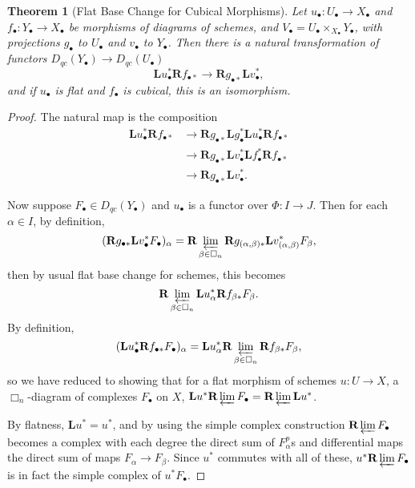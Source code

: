 \documentclass[proquest]{uwthesis}[2014/11/13]
\newtheorem{theorem}{Theorem}[section]
\theoremstyle{definition}
\newcommand{\bL}{\textbf{L}}
\newcommand{\bR}{\textbf{R}}
\begin{document}
\begin{theorem}[Flat Base Change for Cubical Morphisms]
	\label{thm:flatbasechange}
	Let $u_\bullet : U_\bullet \rightarrow X_\bullet$ and $f_\bullet : Y_\bullet \rightarrow X_\bullet$ be morphisms of diagrams of schemes, and $V_\bullet = U_\bullet \times_{X_\bullet} Y_\bullet$, with projections $g_\bullet$ to $U_\bullet$ and $v_\bullet$ to $Y_\bullet$.
	Then there is a natural transformation of functors $D_{qc}(Y_\bullet) \rightarrow D_{qc}(U_\bullet)$
	\[
		\bL u_\bullet^* \bR f_{\bullet *} \rightarrow \bR g_{\bullet *} \bL v_\bullet^*,
	\]
	and if $u_\bullet$ is flat and $f_\bullet$ is cubical, this is an isomorphism.
\end{theorem}
\begin{proof}
	The natural map is the composition
	\begin{align*}
		\bL u_\bullet^* \bR f_{\bullet *} &\rightarrow \bR g_{\bullet *} \bL g_\bullet^* \bL u_\bullet^* \bR f_{\bullet *} \\
		&\rightarrow \bR g_{\bullet *} \bL v_\bullet^* \bL f_\bullet^* \bR f_{\bullet *} \\
		&\rightarrow \bR g_{\bullet *} \bL v_\bullet^*.
	\end{align*}
	
	Now suppose $F_\bullet \in D_{qc}(Y_\bullet)$ and $u_\bullet$ is a functor over $\Phi : I \rightarrow J$.
	Then for each $\alpha \in I$, by definition,
	\[
		(\bR g_{\bullet *} \bL v_\bullet^* F_\bullet)_\alpha = \bR \varprojlim_{\beta \in \Box_n} \bR g_{(\alpha, \beta) *} \bL v_{(\alpha, \beta)}^* F_\beta,
	\]
	then by usual flat base change for schemes, this becomes
	\[
		 \bR \varprojlim_{\beta \in \Box_n} \bL u_{\alpha}^*  \bR f_{\beta *} F_\beta.
	\]
	By definition,
	\[
		(\bL u_\bullet^* \bR f_{\bullet *} F_\bullet)_\alpha = \bL u_\alpha^* \bR \varprojlim_{\beta \in \Box_n} \bR f_{\beta *} F_\beta,
	\]
	so we have reduced to showing that for a flat morphism of schemes $u : U \rightarrow X$, a $\Box_n$-diagram of complexes $F_\bullet$ on $X$, $\bL u^* \bR \varprojlim F_\bullet = \bR \varprojlim \bL u^*$.
	
	By flatness, $\bL u^* = u^*$, and by using the simple complex construction $\bR \varprojlim F_\bullet$ becomes a complex with each degree the direct sum of $F_\alpha^p$s and differential maps the direct sum of maps $F_\alpha \rightarrow F_\beta$.
	Since $u^*$ commutes with all of these, $u^* \bR \varprojlim F_\bullet$ is in fact the simple complex of $u^* F_\bullet$.
\end{proof}
\end{document}
